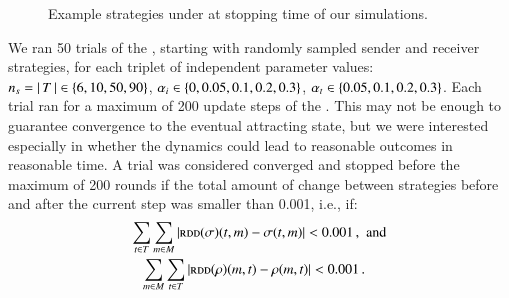\begin{figure}


  \caption{Example strategies under \rdd at stopping time of our simulations.}
  \label{fig:example_strats}
\end{figure}

We ran 50 trials of the \rdd, starting with randomly sampled sender
and receiver strategies, for each triplet of independent parameter
values: $n_s = \left \lvert \, T \, \right\rvert \in \left\{6, 10, 50, 90\right\}$, $\alpha_i \in
\left\{0, 0.05, 0.1, 0.2, 0.3\right\}$, $\alpha_t \in \left\{0.05, 0.1, 0.2,
  0.3\right\}$. Each trial ran for a maximum of 200 update steps of the
\rdd. This may not be enough to guarantee convergence to the eventual
attracting state, but we were interested especially in whether the
dynamics could lead to reasonable outcomes in reasonable time. A trial
was considered converged and stopped before the maximum of 200 rounds
if the total amount of change between strategies before and after the
current \rdd step was smaller than 0.001, i.e., if:
\begin{align*}
  \sum_{t \in T} \sum_{m \in M} \left|
    \textsc{rdd}(\sigma)(t,m) - \sigma(t,m) \right| <
  0.001\,, & \text{\ \ and} \\
  \sum_{m \in M} \sum_{t \in T} \left|
    \textsc{rdd}(\rho)(m,t) - \rho(m,t) \right| <
  0.001 & \,.
\end{align*}

